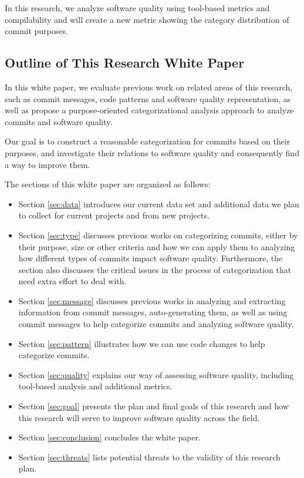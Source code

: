 In this research, we analyze software quality using tool-based metrics and compilability and will create a new metric showing the category distribution of commit purposes.

\subsection{Outline of This Research White Paper}
In this white paper, we evaluate previous work on related areas of this research, such as commit messages, code patterns and software quality representation, as well as propose a purpose-oriented categorizational analysis approach to analyze commits and software quality.

Our goal is to construct a reasonable categorization for commits based on their purposes, and investigate their relations to software quality and consequently find a way to improve them.

The sections of this white paper are organized as follows:
\begin{itemize}
    \item Section \ref{sec:data} introduces our current data set and additional data we plan to collect for current projects and from new projects.
    \item Section \ref{sec:type} discusses previous works on categorizing commits, either by their purpose, size or other criteria and how we can apply them to analyzing how different types of commits impact software quality. Furthermore, the section also discusses the critical issues in the process of categorization that need extra effort to deal with.
    \item Section \ref{sec:message} discusses previous works in analyzing and extracting information from commit messages, auto-generating them, as well as using commit messages to help categorize commits and analyzing software quality.
    \item Section \ref{sec:pattern} illustrates how we can use code changes to help categorize commits.
    \item Section \ref{sec:quality} explains our way of assessing software quality, including tool-based analysis and additional metrics.
    \item Section \ref{sec:goal} presents the plan and final goals of this research and how this research will serve to improve software quality across the field.
    \item Section \ref{sec:conclusion} concludes the white paper.
    \item Section \ref{sec:threats} lists potential threats to the validity of this research plan.
\end{itemize}



